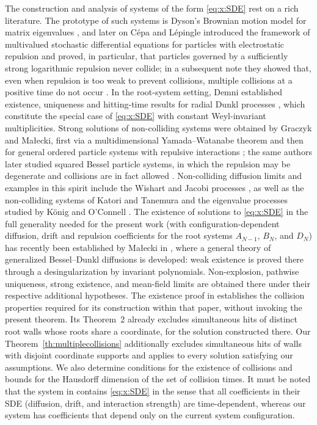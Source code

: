 \documentclass{article}
\numberwithin{equation}{section}
\theoremstyle{plain}
\begin{document}
The construction and analysis of systems of the form \eqref{eq:x:SDE} rest on a rich literature. The prototype of such systems is Dyson's Brownian motion model for matrix eigenvalues \cite{Dyson62A}, and later on Cépa and Lépingle introduced the framework of multivalued stochastic differential equations for particles with electrostatic repulsion \cite{CepaLepingle} and proved, in particular, that particles governed by a sufficiently strong logarithmic repulsion never collide; in a subsequent note they showed that, even when repulsion is too weak to prevent collisions, multiple collisions at a positive time do not occur \cite{CepaLepingle07}. In the root-system setting, Demni established existence, uniqueness and hitting-time results for radial Dunkl processes \cite{Demni09}, which constitute the special case of \eqref{eq:x:SDE} with constant Weyl-invariant multiplicities. Strong solutions of non-colliding systems were obtained by Graczyk and Małecki, first via a multidimensional Yamada–Watanabe theorem \cite{GraczykMalecki13} and then for general ordered particle systems with repulsive interactions \cite{GraczykMalecki}; the same authors later studied squared Bessel particle systems, in which the repulsion may be degenerate and collisions are in fact allowed \cite{GraczykMalecki19}. Non-colliding diffusion limits and examples in this spirit include the Wishart and Jacobi processes \cite{Bru91,Demni10}, as well as the non-colliding systems of Katori and Tanemura \cite{KatoriTanemura04} and the eigenvalue processes studied by König and O'Connell \cite{KonigOConnell01}. The existence of solutions to \eqref{eq:x:SDE} in the full generality needed for the present work (with configuration-dependent diffusion, drift and repulsion coefficients for the root systems $A_{N-1}$, $B_N$, and $D_N$) has recently been established by Małecki in \cite{Malecki25}, where a general theory of generalized Bessel–Dunkl diffusions is developed: weak existence is proved there through a desingularization by invariant polynomials. Non-explosion, pathwise uniqueness, strong existence, and mean-field limits are obtained there under their respective additional hypotheses. The existence proof in \cite[Sections~5-7]{Malecki25} establishes the collision properties required for its construction within that paper, without invoking the present theorem. Its Theorem~2 already excludes simultaneous hits of distinct root walls whose roots share a coordinate, for the solution constructed there. Our Theorem~\ref{th:multiplecollisions} additionally excludes simultaneous hits of walls with disjoint coordinate supports and applies to every solution satisfying our assumptions. We also determine conditions for the existence of collisions and bounds for the Hausdorff dimension of the set of collision times.
It must be noted that the system in \cite{Malecki25} contains \eqref{eq:x:SDE} in the sense that all coefficients in their SDE (diffusion, drift, and interaction strength) are time-dependent, whereas our system has coefficients that depend only on the current system configuration.
\end{document}
